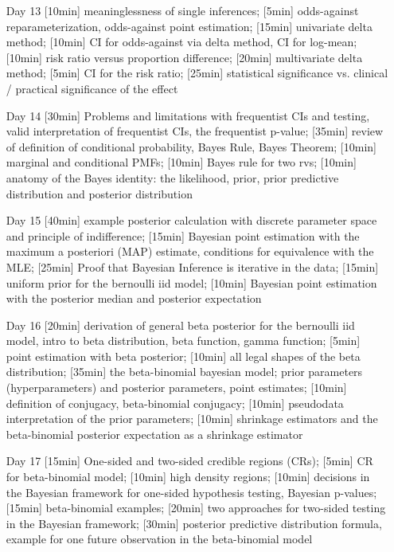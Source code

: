 \begin{enumerate}
\item[Day 13]  [10min] meaninglessness of single inferences; [5min] odds-against reparameterization, odds-against point estimation; [15min] univariate delta method; [10min] CI for odds-against via delta method, CI for log-mean; [10min] risk ratio versus proportion difference; [20min] multivariate delta method; [5min] CI for the risk ratio; [25min] statistical significance vs. clinical / practical significance of the effect

\item[Day 14] [30min] Problems and limitations with frequentist CIs and testing, valid interpretation of frequentist CIs, the frequentist p-value; [35min] review of definition of conditional probability, Bayes Rule, Bayes Theorem; [10min] marginal and conditional PMFs; [10min] Bayes rule for two rvs; [10min] anatomy of the Bayes identity: the likelihood, prior, prior predictive distribution and posterior distribution

\item[Day 15] [40min] example posterior calculation with discrete parameter space and principle of indifference; [15min] Bayesian point estimation with the maximum a posteriori (MAP) estimate, conditions for equivalence with the MLE; [25min] Proof that Bayesian Inference is iterative in the data; [15min] uniform prior for the bernoulli iid model; [10min] Bayesian point estimation with the posterior median and posterior expectation

\item[Day 16] [20min] derivation of general beta posterior for the bernoulli iid model, intro to beta distribution, beta function, gamma function; [5min] point estimation with beta posterior; [10min] all legal shapes of the beta distribution; [35min] the beta-binomial bayesian model; prior parameters (hyperparameters) and posterior parameters, point estimates; [10min] definition of conjugacy, beta-binomial conjugacy; [10min] pseudodata interpretation of the prior parameters; [10min] shrinkage estimators and the beta-binomial posterior expectation as a shrinkage estimator

\item[Day 17] [15min] One-sided and two-sided credible regions (CRs); [5min] CR for beta-binomial model; [10min] high density regions; [10min] decisions in the Bayesian framework for one-sided hypothesis testing, Bayesian p-values; [15min] beta-binomial examples; [20min] two approaches for two-sided testing in the Bayesian framework; [30min] posterior predictive distribution formula, example for one future observation in the beta-binomial model


\end{enumerate}
